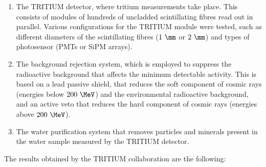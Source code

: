 \begin{enumerate}

\item{} The TRITIUM detector, where tritium measurements take place. This consists of modules of hundreds of uncladded scintillating fibres read out in parallel. Various configurations for the TRITIUM module were tested, such as different diameters of the scintillating fibres ($1~\mm$ or $2~\mm$) and types of photosensor (PMTs or SiPM arrays).

\item{} The background rejection system, which is employed to suppress the radioactive background that affects the minimum detectable activity. This is based on a lead passive shield, that reduces the soft component of cosmic rays (energies below $200~\MeV$) and the environmental radioactive background, and an active veto that reduces the hard component of cosmic rays (energies above $200~\MeV$).

\item{} The water purification system that removes particles and minerals present in the water sample measured by the TRITIUM detector.

\end{enumerate} 

The results obtained by the TRITIUM collaboration are the following:

